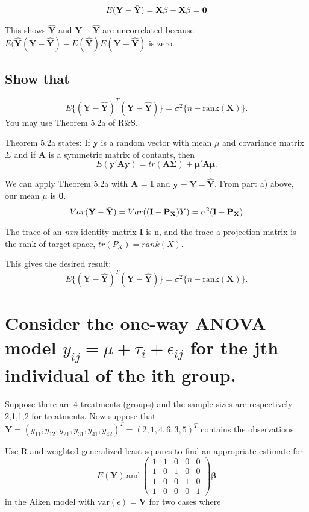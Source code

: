 \documentclass[11pt]{article}
\begin{document}
\[
E(\mathbf{Y} - \hat{\mathbf{Y}})= \mathbf{X\beta} - \mathbf{X\beta} \\
                                = \mathbf{0}
\]

This shows $\hat{\mathbf{Y}}$ and $\mathbf{Y} - \hat{\mathbf{Y}}$ are
uncorrelated because $E(\hat{\mathbf{Y}}(\mathbf{Y} -
\hat{\mathbf{Y}}) - E(\hat{\mathbf{Y}})E(\mathbf{Y} -
\hat{\mathbf{Y}})$ is zero.
\subsection{Show that}
\label{sec-1-2}

$$ E\{(\mathbf{Y} - \hat{\mathbf{Y}})^T(\mathbf{Y} -
\hat{\mathbf{Y}})\} = \sigma^2\{n-\mathrm{rank}(\mathbf{X})\}.$$
You may use Theorem 5.2a of R\&S.


Theorem 5.2a states:
If \textbf{y} is a random vector with mean \textbf{$\mu$} and covariance
matrix \textbf{$\Sigma$} and if \textbf{A} is a symmetric matrix of contants, then 
\[
E(\mathbf{y'Ay}) = tr(\mathbf{A\Sigma}) +\mathbf{\mu' A \mu}.
\]


We can apply Theorem 5.2a with \textbf{A} = \textbf{I} and $\mathbf{y} =
\mathbf{Y} - \hat{\mathbf{Y}}$. From part a) above, our mean \textbf{$\mu$}
is \textbf{0}. 
\[
Var(\mathbf{Y} - \hat{\mathbf{Y}}) = Var ((\mathbf{I} -
\mathbf{P_X})Y) \\
= \sigma^2(\mathbf{I} - \mathbf{P_X})
\]

The trace of an \emph{nxn} identity matrix \textbf{I} is n, and the trace a
projection matrix is the rank of target space, $tr(P_X) = rank(X)$.

This gives the desired result:
$$ E\{(\mathbf{Y} - \hat{\mathbf{Y}})^T(\mathbf{Y} -
\hat{\mathbf{Y}})\} = \sigma^2\{n-\mathrm{rank}(\mathbf{X})\}.$$
\section{Consider the one-way ANOVA model $y_{ij} = \mu + \tau_i + \epsilon_{ij}$ for the jth individual of the ith group.}
\label{sec-2}

Suppose there are 4 treatments (groups) and the sample sizes are 
respectively 2,1,1,2 for treatments.
Now suppose that $\mathbf{Y} = (y_{11}, y_{12}, y_{21}, y_{31},
y_{41}, y_{42})^{T} = (2, 1, 4, 6, 3, 5)^{T}$ contains the observations.

Use R and weighted generalized least squares to find an appropriate 
estimate for
$$E(\mathbf{Y})\,\mathrm{and}\,
\begin{pmatrix}
1 & 1 & 0 & 0 & 0 \\
1 & 0 & 1 & 0 & 0 \\
1 & 0 & 0 & 1 & 0 \\
1 & 0 & 0 & 0 & 1 
\end{pmatrix}\mathbf{\beta}$$
in the Aiken model with $\mathrm{var}(\epsilon) = \mathbf{V}$ for two
cases where
 
\end{document}
